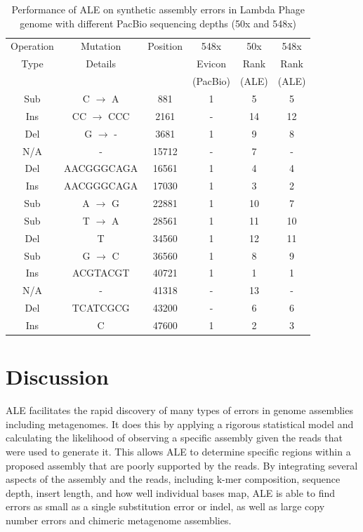 \documentclass[phd,tocprelim]{cornell}
\begin{document}
\begin{table}[!htp]
    \caption[Real Data ALE vs. PacBio]{Performance of ALE on synthetic assembly errors in Lambda Phage genome with different PacBio sequencing depths (50x and 548x)}
    \label{ALEtab2}
    \begin{center}
        \begin{tabular}{cccccc}
Operation & Mutation & Position & 548x& 50x & 548x\\
Type & Details & & Evicon & Rank & Rank\\
 & & & (PacBio) & (ALE) & (ALE)\\
\hline
Sub & C $\rightarrow$ A & 881 & 1 & 5 & 5\\
Ins & CC $\rightarrow$ CCC & 2161 & - & 14 & 12\\
Del & G $\rightarrow$ - & 3681 & 1 & 9 & 8\\
N/A & - & 15712 & - & 7 & -\\
Del & AACGGGCAGA & 16561 & 1 & 4 & 4\\
Ins & AACGGGCAGA & 17030 & 1 & 3 & 2\\
Sub & A $\rightarrow$ G & 22881 & 1 & 10 & 7\\
Sub & T $\rightarrow$ A & 28561 & 1 & 11 & 10\\
Del & T & 34560 & 1 & 12 & 11\\
Sub & G $\rightarrow$ C & 36560 & 1 & 8 & 9\\
Ins & ACGTACGT & 40721 & 1 & 1 & 1\\
N/A & - & 41318 & - & 13 & -\\
Del & TCATCGCG & 43200 & - & 6 & 6\\
Ins & C & 47600 & 1 & 2 & 3
\end{tabular}
\end{center}
\end{table}

\section{Discussion}

ALE facilitates the rapid discovery of many types of errors in genome assemblies including metagenomes. It does this by applying a rigorous statistical model and calculating the likelihood of observing a specific assembly given the reads that were used to generate it. This allows ALE to determine specific regions within a proposed assembly that are poorly supported by the reads. By integrating several aspects of the assembly and the reads, including k-mer composition, sequence depth, insert length, and how well individual bases map, ALE is able to find errors as small as a single substitution error or indel, as well as large copy number errors and chimeric metagenome assemblies.
\end{document}
